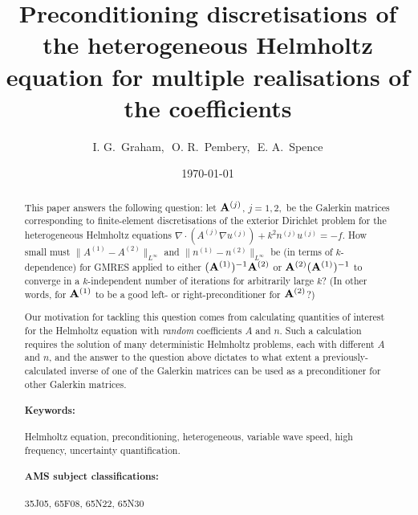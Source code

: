 \documentclass[10pt]{article}%
\numberwithin{equation}{section}
\newcommand{\matrixA}{{\bf A}}
\newcommand{\matrixAj}{{\bf A}^{(j)}}
\newcommand{\coeffAj}{A^{(j)}}
\newcommand{\coeffAo}{A^{(1)}}
\newcommand{\coeffAt}{A^{(2)}}
\newcommand{\coeffnj}{n^{(j)}}
\newcommand{\coeffno}{n^{(1)}}
\newcommand{\coeffnt}{n^{(2)}}
\newcommand{\solj}{u^{(j)}}
\begin{document}
\title{Preconditioning discretisations of the heterogeneous Helmholtz equation for multiple realisations of the coefficients
}

\author{
I. G.~Graham\footnotemark[1],\,\, 
O. R.~Pembery\footnotemark[1],\,\, 
E. A.~Spence\footnotemark[1]
}

\date{\today}

\renewcommand{\thefootnote}{\fnsymbol{footnote}}


\renewcommand{\thefootnote}{\arabic{footnote}}

\maketitle

\begin{abstract}

This paper answers the following question: let $\matrixAj$, $j=1,2,$ be the Galerkin matrices corresponding to finite-element discretisations of the exterior Dirichlet problem for the heterogeneous Helmholtz equations $\nabla\cdot (\coeffAj \nabla \solj) + k^2 \coeffnj \solj = -f$. How small must 
$\|\coeffAo - \coeffAt\|_{L^\infty}$ and 
$\|\coeffno - \coeffnt\|_{L^\infty}$ be (in terms of $k$-dependence) for GMRES applied to either $(\matrixA^{(1)})^{-1}\matrixA^{(2)}$ 
or $\matrixA^{(2)}(\matrixA^{(1)})^{-1}$
to converge in a $k$-independent number of iterations
 for arbitrarily large $k$? (In other words, for $\matrixA^{(1)}$ to be a good left- or right-preconditioner for $\matrixA^{(2)}$?)

Our motivation for tackling this question comes from calculating quantities of interest for the Helmholtz equation with \emph{random} coefficients $A$ and $n$. Such a calculation requires the solution of many deterministic Helmholtz problems, each with different $A$ and $n$, and the answer to the question above dictates to what extent a previously-calculated inverse of one of the Galerkin matrices can be used as a preconditioner for other Galerkin matrices. 

\paragraph{Keywords:} Helmholtz equation, preconditioning, heterogeneous, variable wave speed, high frequency, uncertainty quantification.

\paragraph{AMS subject classifications:} 35J05, 65F08, 65N22, 65N30  

\end{abstract}
\end{document}
